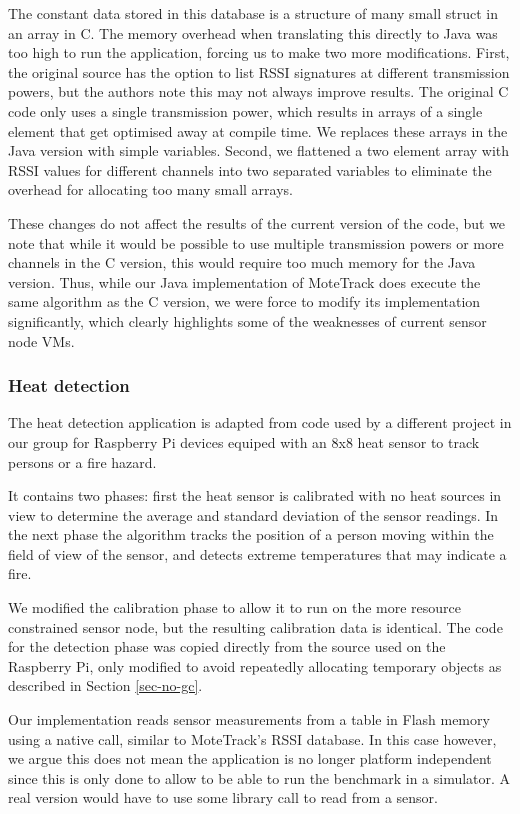 The constant data stored in this database is a structure of many small struct in an array in C. The memory overhead when translating this directly to Java was too high to run the application, forcing us to make two more modifications. First, the original source has the option to list RSSI signatures at different transmission powers, but the authors note this may not always improve results. The original C code only uses a single transmission power, which results in arrays of a single element that get optimised away at compile time. We replaces these arrays in the Java version with simple variables. Second, we flattened a two element array with RSSI values for different channels into two separated variables to eliminate the overhead for allocating too many small arrays.

These changes do not affect the results of the current version of the code, but we note that while it would be possible to use multiple transmission powers or more channels in the C version, this would require too much memory for the Java version. Thus, while our Java implementation of MoteTrack does execute the same algorithm as the C version, we were force to modify its implementation significantly, which clearly highlights some of the weaknesses of current sensor node VMs.


\subsubsection{Heat detection}
The heat detection application is adapted from code used by a different project in our group for Raspberry Pi devices equiped with an 8x8 heat sensor to track persons or a fire hazard.

It contains two phases: first the heat sensor is calibrated with no heat sources in view to determine the average and standard deviation of the sensor readings. In the next phase the algorithm tracks the position of a person moving within the field of view of the sensor, and detects extreme temperatures that may indicate a fire.

We modified the calibration phase to allow it to run on the more resource constrained sensor node, but the resulting calibration data is identical. The code for the detection phase was copied directly from the source used on the Raspberry Pi, only modified to avoid repeatedly allocating temporary objects as described in Section \ref{sec-no-gc}.

Our implementation reads sensor measurements from a table in Flash memory using a native call, similar to MoteTrack's RSSI database. In this case however, we argue this does not mean the application is no longer platform independent since this is only done to allow to be able to run the benchmark in a simulator. A real version would have to use some library call to read from a sensor.


